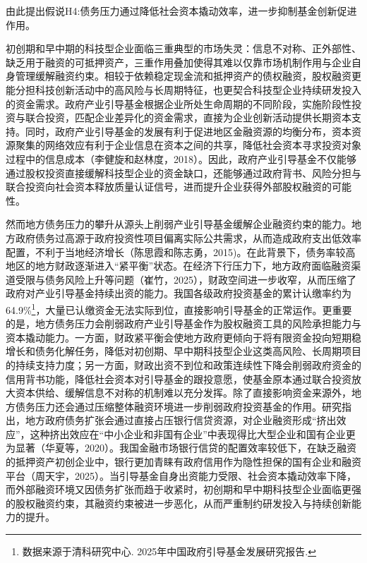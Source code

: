 \documentclass[UTF8,a4paper,zihao=5,fontset=fandol]{ctexart}
\begin{document}
由此提出假说H4:债务压力通过降低社会资本撬动效率，进一步抑制基金创新促进作用。

初创期和早中期的科技型企业面临三重典型的市场失灵：信息不对称、正外部性、缺乏用于融资的可抵押资产，三重作用叠加使得其难以仅靠市场机制作用与企业自身管理缓解融资约束。相较于依赖稳定现金流和抵押资产的债权融资，股权融资更能分担科技创新活动中的高风险与长周期特征，也更契合科技型企业持续研发投入的资金需求。政府产业引导基金根据企业所处生命周期的不同阶段，实施阶段性投资与联合投资，匹配企业差异化的资金需求，直接为企业创新活动提供长期资本支持。同时，政府产业引导基金的发展有利于促进地区金融资源的均衡分布，资本资源聚集的网络效应有利于企业信息在资本之间的共享，降低社会资本寻求投资对象过程中的信息成本（李健旋和赵林度，2018）。因此，政府产业引导基金不仅能够通过股权投资直接缓解科技型企业的资金缺口，还能够通过政府背书、风险分担与联合投资向社会资本释放质量认证信号，进而提升企业获得外部股权融资的可能性。

然而地方债务压力的攀升从源头上削弱产业引导基金缓解企业融资约束的能力。地方政府债务过高源于政府投资性项目偏离实际公共需求，从而造成政府支出低效率配置，不利于当地经济增长（陈思霞和陈志勇，2015)。在此背景下，债务率较高地区的地方财政逐渐进入“紧平衡”状态。在经济下行压力下，地方政府面临融资渠道受限与债务风险上升等问题（崔竹，2025），财政空间进一步收窄，从而压缩了政府对产业引导基金持续出资的能力。我国各级政府投资基金的累计认缴率约为64.9\%\footnote[1]{\hspace*{2em}数据来源于清科研究中心. 2025年中国政府引导基金发展研究报告.}，大量已认缴资金无法实际到位，直接影响引导基金的正常运作。更重要的是，地方债务压力会削弱政府产业引导基金作为股权融资工具的风险承担能力与资本撬动能力。一方面，财政紧平衡会使地方政府更倾向于将有限资金投向短期稳增长和债务化解任务，降低对初创期、早中期科技型企业这类高风险、长周期项目的持续支持力度；另一方面，财政出资不到位和政策连续性下降会削弱政府资金的信用背书功能，降低社会资本对引导基金的跟投意愿，使基金原本通过联合投资放大资本供给、缓解信息不对称的机制难以充分发挥。除了直接影响资金来源外，地方债务压力还会通过压缩整体融资环境进一步削弱政府投资基金的作用。研究指出，地方政府债务扩张会通过直接占压银行信贷资源，对企业融资形成“挤出效应”，这种挤出效应在“中小企业和非国有企业”中表现得比大型企业和国有企业更为显著（华夏等，2020）。我国金融市场银行信贷的配置效率较低下，在缺乏融资的抵押资产初创企业中，银行更加青睐有政府信用作为隐性担保的国有企业和融资平台（周天宇，2025）。当引导基金自身出资能力受限、社会资本撬动效率下降，而外部融资环境又因债务扩张而趋于收紧时，初创期和早中期科技型企业面临更强的股权融资约束，其融资约束被进一步恶化，从而严重制约研发投入与持续创新能力的提升。
\end{document}
